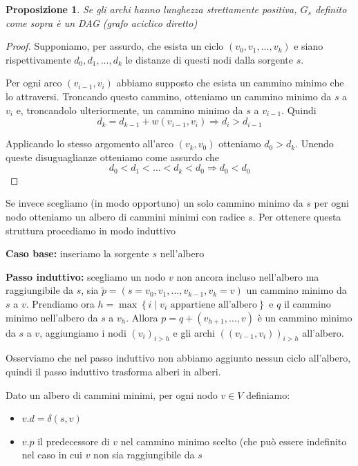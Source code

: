 \documentclass[a4paper,10pt]{amsbook}
\newcounter{counter1}
\theoremstyle{plain}
\newtheorem{mypro}[counter1]{Proposizione}
\theoremstyle{definition}
\theoremstyle{remark}
\newcommand{\set}[1]{\left\{#1\right\}}
\newcommand{\pa}[1]{\left(#1\right)}
\begin{document}
\begin{mypro}
  Se gli archi hanno lunghezza strettamente positiva, $G_s$ definito
  come sopra è un DAG (grafo aciclico diretto)
\end{mypro}
\begin{proof}
  Supponiamo, per assurdo, che esista un ciclo $(v_0,v_1,...,v_k)$ e
  siano rispettivamente $d_0,d_1,...,d_k$ le distanze di questi nodi
  dalla sorgente $s$.

  Per ogni arco $(v_{i-1},v_i)$ abbiamo supposto che esista un cammino
  minimo che lo attraversi. Troncando questo cammino, otteniamo un
  cammino minimo da $s$ a $v_i$ e, troncandolo ulteriormente, un
  cammino minimo da $s$ a $v_{i-1}$. Quindi
  \[ d_k = d_{k-1} + w\pa{ v_{i-1} , v_i  } \Rightarrow d_i >
  d_{i-1} \]
  
  Applicando lo stesso argomento all'arco $(v_k,v_0)$ otteniamo $d_0 >
  d_k$. Unendo queste disuguaglianze otteniamo come assurdo che
  \[ d_0 < d_1 < \dots < d_k < d_0 \Rightarrow d_0 < d_0 \]
\end{proof}

Se invece scegliamo (in modo opportuno) un solo cammino minimo da $s$
per ogni nodo otteniamo un albero di cammini minimi con radice
$s$. Per ottenere questa struttura procediamo in modo induttivo

\textbf{Caso base:} inseriamo la sorgente $s$ nell'albero

\textbf{Passo induttivo:} scegliamo un nodo $v$ non ancora incluso
nell'albero ma raggiungibile da $s$, sia $\tilde p = (s=v_0,v_1,...,
v_{k-1}, v_k=v)$ un cammino minimo da $s$ a $v$. Prendiamo ora $h =
\max\set{ i \mid v_i \text{ appartiene all'albero}}$ e $q$ il cammino
minimo nell'albero da $s$ a $v_h$. Allora $p = q + (v_{h+1}, \dots ,
v)$ è un cammino minimo da $s$ a $v$, aggiungiamo i nodi $\pa{ v_i }
_{i>h}$ e gli archi $\pa{(v_{i-1},v_i)}_{i>h}$ all'albero.

Osserviamo che nel passo induttivo non abbiamo aggiunto nessun ciclo
all'albero, quindi il passo induttivo trasforma alberi in alberi.

Dato un albero di cammini minimi, per ogni nodo $v\in V$ definiamo:
\begin{itemize}
\item $v.d = \delta(s,v)$
\item $v.p$ il predecessore di $v$ nel cammino minimo scelto (che può
  essere indefinito nel caso in cui $v$ non sia raggiungibile da $s$
\end{itemize}
\end{document}
